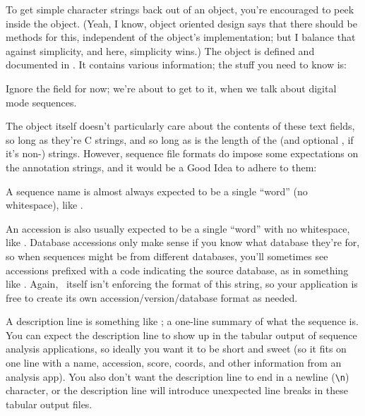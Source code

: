 To get simple character strings back out of an  object,
you're encouraged to peek inside the object. (Yeah, I know, object
oriented design says that there should be methods for this,
independent of the object's implementation; but I balance that against
simplicity, and here, simplicity wins.) The object is defined and
documented in . It contains various information; the
stuff you need to know is:



Ignore the  field for now; we're about to get to it, when
we talk about digital mode sequences.

The  object itself doesn't particularly care about the
contents of these text fields, so long as they're C strings, and so
long as  is the length of the  (and optional
, if it's non-) strings. However, sequence file
formats do impose some expectations on the annotation strings, and it
would be a Good Idea to adhere to them:

\begin{sreitems} {}
\item [\emcode{name}] A sequence name is almost always expected to be
  a single ``word'' (no whitespace), like . 

\item [\emcode{acc}] An accession is also usually expected to be a
  single ``word'' with no whitespace, like . Database
  accessions only make sense if you know what database they're for, so
  when sequences might be from different databases, you'll sometimes
  see accessions prefixed with a code indicating the source database,
  as in something like . Again, \Easel\ itself
  isn't enforcing the format of this string, so your application is
  free to create its own accession/version/database format as needed.

\item [\emcode{desc}] A description line is something like ; a one-line summary of what the sequence is. You can expect
the description line to show up in the tabular output of sequence
analysis applications, so ideally you want it to be short and sweet
(so it fits on one line with a name, accession, score, coords, and
other information from an analysis app). You also don't want the
description line to end in a newline (\verb+\n+) character, or the
description line will introduce unexpected line breaks in these
tabular output files.
\end{sreitems}

